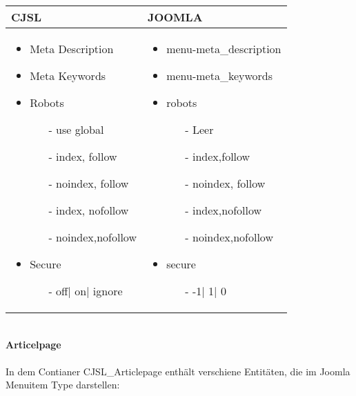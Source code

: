 \begin{minipage}{0.6\textwidth}
\begin{tabular}{|p{}|p{} |}
\hline
\textbf{CJSL} 
&  
\textbf{JOOMLA} \\ \hline
\begin{itemize}
\item Meta Description
    \item Meta Keywords
    \item Robots
    \begin{enumerate}
	    \item[-] use global
	    \item[-] index, follow
	    \item[-] noindex, follow
	    \item[-]index, nofollow
	    \item[-] noindex,nofollow
    \end{enumerate}
    \item Secure
    \begin{enumerate}
	    \item[-]off| on| ignore
    \end{enumerate}
\end{itemize}
&
\begin{itemize}
\item menu-meta\_description
\item menu-meta\_keywords
\item robots
	\begin{enumerate}
	\item[-] Leer
	\item[-] index,follow
	\item[-] noindex, follow
	\item[-] index,nofollow
	\item[-] noindex,nofollow
	\end{enumerate}
\item secure
	\begin{enumerate}
	\item[-]-1| 1| 0
	\end{enumerate}
\end{itemize} \\ \hline
\end{tabular}
\end{minipage}
\linebreak
\\
\textbf{Articelpage}
\\
\\
In dem Contianer CJSL\_Articlepage enthält verschiene Entitäten, die im Joomla Menuitem Type darstellen:

